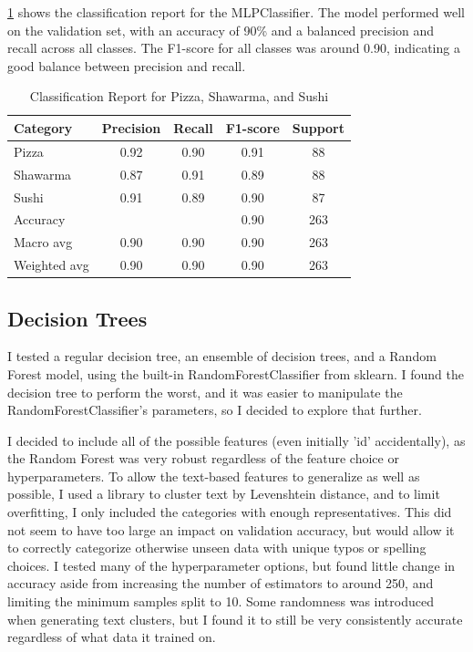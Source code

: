 \begin{itemize}
\ref{tab:nn_classification_report} shows the classification report for the MLPClassifier.
The model performed well on the validation set, with an accuracy of 90\% and a balanced precision and recall across all classes.
The F1-score for all classes was around 0.90, indicating a good balance between precision and recall.

\begin{table}[ht]
    \centering
    \begin{tabular}{lcccc}
        \hline
        Category     & Precision & Recall & F1-score & Support \\
        \hline
        Pizza        & 0.92      & 0.90   & 0.91     & 88      \\
        Shawarma     & 0.87      & 0.91   & 0.89     & 88      \\
        Sushi        & 0.91      & 0.89   & 0.90     & 87      \\
        \hline
        Accuracy     &           &        & 0.90     & 263     \\
        Macro avg    & 0.90      & 0.90   & 0.90     & 263     \\
        Weighted avg & 0.90      & 0.90   & 0.90     & 263     \\
        \hline
    \end{tabular}
    \caption{Classification Report for Pizza, Shawarma, and Sushi}
    \label{tab:nn_classification_report}
\end{table}


\subsection{Decision Trees}
I tested a regular decision tree, an ensemble of decision trees, and a Random Forest model, using the built-in RandomForestClassifier from sklearn. I found the decision tree to perform the worst, and it was easier to manipulate the RandomForestClassifier’s parameters, so I decided to explore that further.

I decided to include all of the possible features (even initially 'id' accidentally), as the Random Forest was very robust regardless of the feature choice or hyperparameters. To allow the text-based features to generalize as well as possible, I used a library to cluster text by Levenshtein distance, and to limit overfitting, I only included the categories with enough representatives. This did not seem to have too large an impact on validation accuracy, but would allow it to correctly categorize otherwise unseen data with unique typos or spelling choices.
I tested many of the hyperparameter options, but found little change in accuracy aside from increasing the number of estimators to around 250, and limiting the minimum samples split to 10. Some randomness was introduced when generating text clusters, but I found it to still be very consistently accurate regardless of what data it trained on.


\end{itemize}
